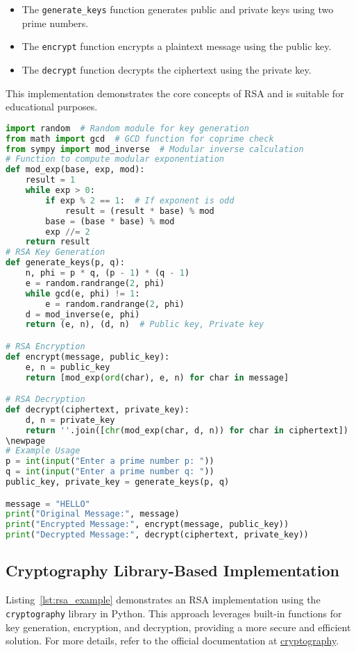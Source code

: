\documentclass[12pt,a4paper]{report}
\begin{document}
\begin{itemize}
    \item The \texttt{generate\_keys} function generates public and private keys using two prime numbers.
    \item The \texttt{encrypt} function encrypts a plaintext message using the public key.
    \item The \texttt{decrypt} function decrypts the ciphertext using the private key.
\end{itemize}

This implementation demonstrates the core concepts of RSA and is suitable for educational purposes.

\begin{lstlisting}[language=Python, caption=RSA Encryption and Decryption Example (Python 3.8+), label={lst:rsa_example_generic}]
import random  # Random module for key generation
from math import gcd  # GCD function for coprime check
from sympy import mod_inverse  # Modular inverse calculation
# Function to compute modular exponentiation
def mod_exp(base, exp, mod):
    result = 1
    while exp > 0:
        if exp % 2 == 1:  # If exponent is odd
            result = (result * base) % mod
        base = (base * base) % mod
        exp //= 2
    return result
# RSA Key Generation
def generate_keys(p, q):
    n, phi = p * q, (p - 1) * (q - 1)
    e = random.randrange(2, phi)
    while gcd(e, phi) != 1:
        e = random.randrange(2, phi)
    d = mod_inverse(e, phi)
    return (e, n), (d, n)  # Public key, Private key

# RSA Encryption
def encrypt(message, public_key):
    e, n = public_key
    return [mod_exp(ord(char), e, n) for char in message]

# RSA Decryption
def decrypt(ciphertext, private_key):
    d, n = private_key
    return ''.join([chr(mod_exp(char, d, n)) for char in ciphertext])
\newpage
# Example Usage
p = int(input("Enter a prime number p: "))
q = int(input("Enter a prime number q: "))
public_key, private_key = generate_keys(p, q)

message = "HELLO"
print("Original Message:", message)
print("Encrypted Message:", encrypt(message, public_key))
print("Decrypted Message:", decrypt(ciphertext, private_key))
\end{lstlisting}

\subsection{Cryptography Library-Based Implementation}
Listing~\ref{lst:rsa_example} demonstrates an RSA implementation using the \texttt{cryptography} library in Python. This approach leverages built-in functions for key generation, encryption, and decryption, providing a more secure and efficient solution. For more details, refer to the official documentation at \href{https://cryptography.io/en/latest/hazmat/primitives/asymmetric/rsa/#}{cryptography}.
\end{document}
